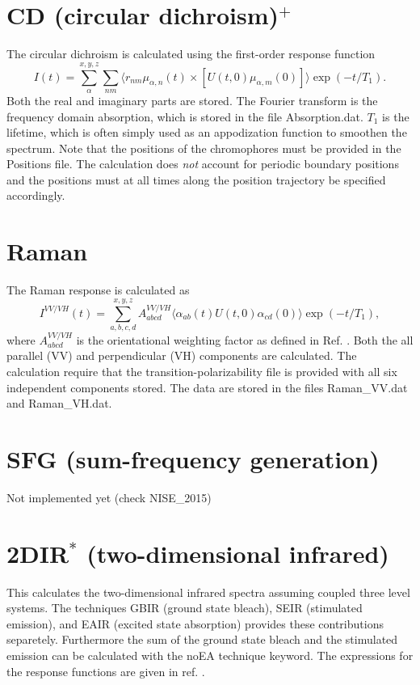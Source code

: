 \section{CD (circular dichroism)$^{+}$}
The circular dichroism is calculated using the first-order response function
\begin{equation}
	I(t)=\sum_{\alpha}^{x,y,z}\sum_{nm}\langle r_{nm}\mu_{\alpha,n}(t)\times[U(t,0)\mu_{\alpha,m}(0)]\rangle\exp(-t/T_1).
\end{equation}
Both the real and imaginary parts are stored. The Fourier transform is the frequency domain absorption, which is stored in the file Absorption.dat. $T_1$ is the lifetime, which is often simply used as an appodization function to smoothen the spectrum. Note that the positions of the chromophores must be provided in the Positions file. The calculation does \textit{not} account for periodic boundary positions and the positions must at all times along the position trajectory be specified accordingly.
\section{Raman}
The Raman response is calculated as \cite{Torii.2002.J.Phys.Chem.A.106.3281,Shi.2012.J.Phys.Chem.B.116.13821}
\begin{equation}
        I^{VV/VH}(t)=\sum_{a,b,c,d}^{x,y,z}A^{VV/VH}_{abcd}\langle\alpha_{ab}(t)U(t,0)\alpha_{cd}(0)\rangle\exp(-t/T_1),
\end{equation}
where $A^{VV/VH}_{abcd}$ is the orientational weighting factor as defined in Ref. . 
Both the all parallel (VV) and perpendicular (VH) components are calculated. The calculation require that the transition-polarizability file is provided with all six independent components stored. The data are stored in the files Raman\_VV.dat and Raman\_VH.dat.
\section{SFG (sum-frequency generation)}
Not implemented yet (check NISE\_2015)
\section{2DIR$^{*}$ (two-dimensional infrared)}
This calculates the two-dimensional infrared spectra assuming coupled three level systems. The techniques GBIR (ground state bleach), SEIR (stimulated emission), and EAIR (excited state absorption) provides these contributions separetely. Furthermore the sum of the ground state bleach and the stimulated emission can be calculated with the noEA technique keyword. The expressions for the response functions are given in ref. \cite{Jansen.2006.JPCB.110.22910}.
